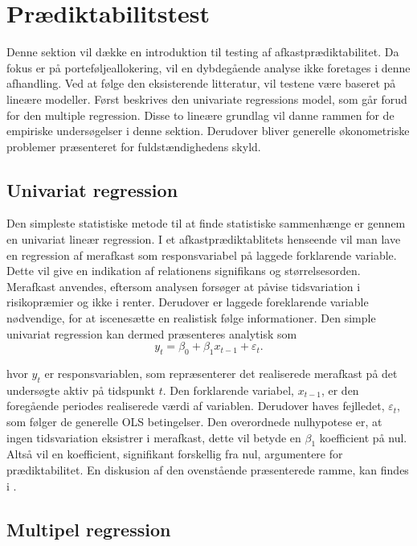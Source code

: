 \documentclass[
  a4paper,
  oneside]{memoir}
\begin{document}
\hypertarget{sekpradik}{%
\section{Prædiktabilitstest}\label{sekpradik}}

Denne sektion vil dække en introduktion til testing af afkastprædiktabilitet. Da fokus er på porteføljeallokering, vil en dybdegående analyse ikke foretages i denne afhandling. Ved at følge den eksisterende litteratur, vil testene være baseret på lineære modeller. Først beskrives den univariate regressions model, som går forud for den multiple regression. Disse to lineære grundlag vil danne rammen for de empiriske undersøgelser i denne sektion. Derudover bliver generelle økonometriske problemer præsenteret for fuldstændighedens skyld.

\hypertarget{univariat-regression}{%
\subsection{Univariat regression}\label{univariat-regression}}

Den simpleste statistiske metode til at finde statistiske sammenhænge er gennem en univariat lineær regression. I et afkastprædiktablitets henseende vil man lave en regression af merafkast som responsvariabel på laggede forklarende variable. Dette vil give en indikation af relationens signifikans og størrelsesorden. Merafkast anvendes, eftersom analysen forsøger at påvise tidsvariation i risikopræmier og ikke i renter. Derudover er laggede foreklarende variable nødvendige, for at iscenesætte en realistisk følge informationer. Den simple univariat regression kan dermed præsenteres analytisk som
\[y_t=\beta_0 + \beta_1 x_{t-1} + \varepsilon_t.\]

hvor \(y_t\) er responsvariablen, som repræsenterer det realiserede merafkast på det undersøgte aktiv på tidspunkt \(t\). Den forklarende variabel, \(x_{t-1}\), er den foregående periodes realiserede værdi af variablen. Derudover haves fejlledet, \(\varepsilon_t\), som følger de generelle OLS betingelser. Den overordnede nulhypotese er, at ingen tidsvariation eksistrer i merafkast, dette vil betyde en \(\beta_1\) koefficient på nul. Altså vil en koefficient, signifikant forskellig fra nul, argumentere for prædiktabilitet. En diskusion af den ovenstående præsenterede ramme, kan findes i \citep{Stambaugh1999}.

\hypertarget{multipel-regression}{%
\subsection{Multipel regression}\label{multipel-regression}}
\end{document}
